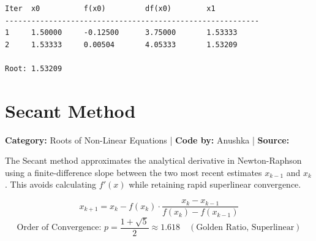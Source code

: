 \documentclass[10pt,a4paper]{report}
\begin{document}
\begin{tcolorbox}[colback=termbg,colframe=primary,title=\textbf{Program Execution Output \& Convergence Table},boxrule=1pt,arc=2mm]
\begin{lstlisting}[style=terminal_output]
Iter  x0          f(x0)         df(x0)        x1          
----------------------------------------------------------
1     1.50000     -0.12500      3.75000       1.53333     
2     1.53333     0.00504       4.05333       1.53209     

Root: 1.53209
\end{lstlisting}
\end{tcolorbox}

\newpage

\section{Secant Method}
\textbf{Category:} \textcolor{secondary}{Roots of Non-Linear Equations} \quad | \quad \textbf{Code by:} \textcolor{secondary}{Anushka} \quad | \quad \textbf{Source:} \texttt{}

The Secant method approximates the analytical derivative in Newton-Raphson using a finite-difference slope between the two most recent estimates $x_{k-1}$ and $x_k$. This avoids calculating $f'(x)$ while retaining rapid superlinear convergence.

\begin{tcolorbox}[colback=theorybg,colframe=theoryframe,title=\textbf{Mathematical Theory \& Formulation},boxrule=1pt,arc=2mm]
\[
x_{k+1} = x_k - f(x_k) \cdot \frac{x_k - x_{k-1}}{f(x_k) - f(x_{k-1})}
\]
\[
\text{Order of Convergence: } p = \frac{1 + \sqrt{5}}{2} \approx 1.618 \quad (\text{Golden Ratio, Superlinear})
\]
\end{tcolorbox}
\end{document}
